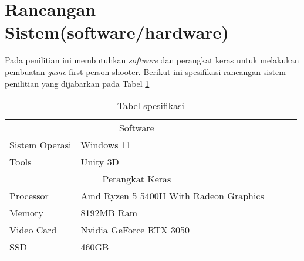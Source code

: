 \section{Rancangan Sistem(software/hardware)}
\noindent

    Pada penilitian ini membutuhkan \textit{software} dan perangkat keras untuk melakukan pembuatan \textit{game} first person shooter. Berikut ini spesifikasi rancangan sistem penilitian yang dijabarkan pada Tabel \ref{tb:tabel-spesifikasi}
    
    \begin{table}[h]
        \centering
        \caption{Tabel spesifikasi}
        \label{tb:tabel-spesifikasi}
        \begin{tabular}{|ll|lll}
        \cline{1-2}
        \multicolumn{2}{|c|}{Software}                                                &  &  &  \\ \cline{1-2}
        \multicolumn{1}{|l|}{Sistem Operasi} & Windows 11                             &  &  &  \\ \cline{1-2}
        \multicolumn{1}{|l|}{Tools}          & Unity 3D                                 &  &  &  \\ \cline{1-2}
        \multicolumn{2}{|c|}{Perangkat Keras}                                         &  &  &  \\ \cline{1-2}
        \multicolumn{1}{|l|}{Processor}      & Amd Ryzen 5 5400H With Radeon Graphics &  &  &  \\ \cline{1-2}
        \multicolumn{1}{|l|}{Memory}         & 8192MB Ram                             &  &  &  \\ \cline{1-2}
        \multicolumn{1}{|l|}{Video Card}     & Nvidia GeForce RTX 3050                &  &  &  \\ \cline{1-2}
        \multicolumn{1}{|l|}{SSD}            & 460GB                                  &  &  &  \\ \cline{1-2}
        \end{tabular}
        \end{table}

